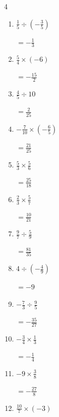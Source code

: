 \begin{multicols}{4}
\begin{enumerate}
\resetques

  \item $\displaystyle \frac{1}{5}\div{}\left(-\frac{3}{5}\right)$

        $\displaystyle =-\frac{1}{3}$

  \item $\displaystyle \frac{5}{4}\times{}\left(-6\right)$

        $\displaystyle =-\frac{15}{2}$

  \item $\displaystyle \frac{4}{5}\div{}10$

        $\displaystyle =\frac{2}{25}$

  \item $\displaystyle -\frac{7}{10}\times{}\left(-\frac{6}{5}\right)$

        $\displaystyle =\frac{21}{25}$

  \item $\displaystyle \frac{5}{3}\times{}\frac{5}{6}$

        $\displaystyle =\frac{25}{18}$

  \item $\displaystyle \frac{2}{3}\times{}\frac{5}{7}$

        $\displaystyle =\frac{10}{21}$

  \item $\displaystyle \frac{9}{7}\div{}\frac{5}{9}$

        $\displaystyle =\frac{81}{35}$

  \item $\displaystyle 4\div{}\left(-\frac{4}{9}\right)$

        $\displaystyle =-9$

  \item $\displaystyle -\frac{7}{3}\div{}\frac{9}{5}$

        $\displaystyle =-\frac{35}{27}$

  \item $\displaystyle -\frac{3}{4}\times{}\frac{1}{3}$

        $\displaystyle =-\frac{1}{4}$

\columnbreak %

  \item $\displaystyle -9\times{}\frac{3}{8}$

        $\displaystyle =-\frac{27}{8}$

  \item $\displaystyle \frac{10}{7}\times{}\left(-3\right)$


\end{enumerate}
\end{multicols}
